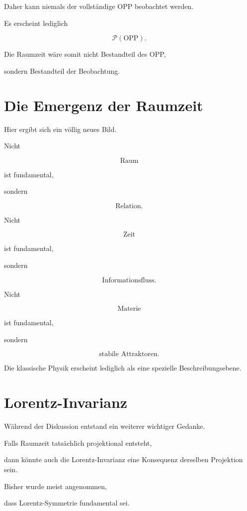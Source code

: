 Daher kann niemals der vollständige OPP beobachtet werden.

Es erscheint lediglich

\[
\mathcal{P}(\mathrm{OPP}).
\]

Die Raumzeit wäre somit nicht Bestandteil des OPP,

sondern Bestandteil der Beobachtung.


\section*{Die Emergenz der Raumzeit}

Hier ergibt sich ein völlig neues Bild.

Nicht

\[
\text{Raum}
\]

ist fundamental,

sondern

\[
\text{Relation}.
\]

Nicht

\[
\text{Zeit}
\]

ist fundamental,

sondern

\[
\text{Informationsfluss}.
\]

Nicht

\[
\text{Materie}
\]

ist fundamental,

sondern

\[
\text{stabile Attraktoren}.
\]

Die klassische Physik erscheint lediglich als eine spezielle Beschreibungsebene.


\section*{Lorentz-Invarianz}

Während der Diskussion entstand ein weiterer wichtiger Gedanke.

Falls Raumzeit tatsächlich projektional entsteht,

dann könnte auch die Lorentz-Invarianz eine Konsequenz derselben Projektion sein.

Bisher wurde meist angenommen,

dass Lorentz-Symmetrie fundamental sei.

